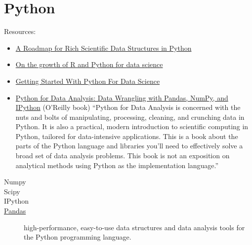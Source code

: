 \chapter{Python}

Resources:

\begin{itemize}
\item \href{http://wesmckinney.com/blog/?p=77}{A Roadmap for Rich Scientific Data Structures in Python}
\item \href{http://blog.revolutionanalytics.com/2013/12/r-and-python.html}{On the growth of R and Python for data science}
\item \href{http://www.kaggle.com/wiki/GettingStartedWithPythonForDataScience}{Getting Started With Python For Data Science}
\item \href{http://shop.oreilly.com/product/0636920023784.do}{Python
  for Data Analysis: Data Wrangling with Pandas, NumPy, and IPython}
  (O'Reilly book) ``Python for Data Analysis is concerned with the
  nuts and bolts of manipulating, processing, cleaning, and crunching
  data in Python. It is also a practical, modern introduction to
  scientific computing in Python, tailored for data-intensive
  applications. This is a book about the parts of the Python language
  and libraries you’ll need to effectively solve a broad set of data
  analysis problems. This book is not an exposition on analytical
  methods using Python as the implementation language.''
\end{itemize}


\begin{description}
\item [Numpy]
\item [Scipy]
\item [IPython]
\item [\href{http://pandas.pydata.org/}{Pandas}] high-performance, easy-to-use data structures and data analysis tools for the Python programming language.

\end{description}
